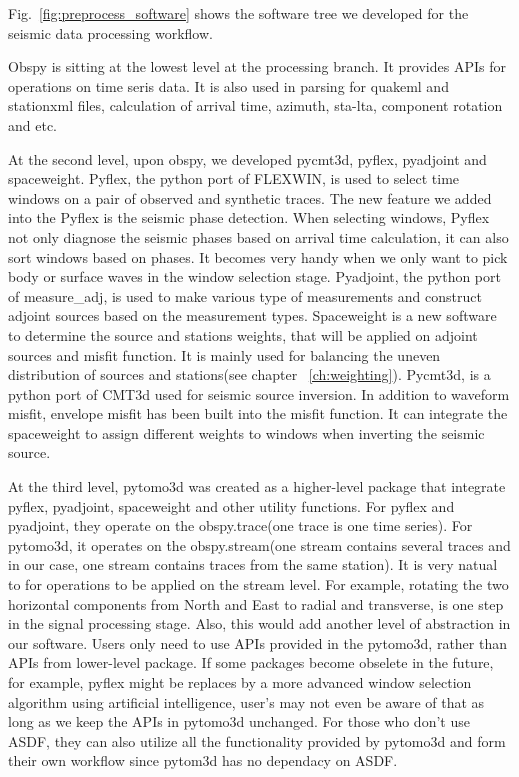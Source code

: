 Fig.~\ref{fig:preprocess_software} shows the software tree we developed
for the seismic data processing workflow.

Obspy is sitting at the lowest level at the processing branch. It provides
APIs for operations on time seris data. It is also used in
parsing for quakeml and stationxml files, calculation of arrival time, azimuth,
sta-lta, component rotation and etc.

At the second level, upon obspy, we developed pycmt3d, pyflex, pyadjoint and spaceweight.
Pyflex, the python port of FLEXWIN, is used to select time windows on a pair of observed
and synthetic traces. The new feature we added into the Pyflex is the seismic
phase detection. When selecting windows, Pyflex not only diagnose the seismic phases
based on arrival time calculation, it can also sort windows based on phases.
It becomes very handy when we only want to pick body or surface waves in the window
selection stage. Pyadjoint, the python port of measure\_adj, is used to make
various type of measurements and construct adjoint sources based on the measurement
types. Spaceweight is a new software to determine the source and stations weights,
that will be applied on adjoint sources and misfit function. It is mainly used for
balancing the uneven distribution of sources and stations(see chapter ~\ref{ch:weighting}).
Pycmt3d, is a python port of CMT3d used for seismic source inversion. In addition
to waveform misfit, envelope misfit has been built into the misfit function. It
can integrate the spaceweight to assign different weights to windows when inverting
the seismic source.

At the third level, pytomo3d was created as a higher-level package that integrate
pyflex, pyadjoint, spaceweight and other utility functions.
For pyflex and pyadjoint, they operate on the 
obspy.trace(one trace is one time series). For pytomo3d, it operates on the
obspy.stream(one stream contains several traces and in our case, one stream
contains traces from the same station). It is very natual to for operations to be
applied on the stream level. For example, rotating the two horizontal components 
from North and East to radial and transverse, is one step in the signal processing
stage. Also, this would add another level of abstraction in our software.
Users only need to use APIs provided in the pytomo3d,
rather than APIs from lower-level package.
If some packages become obselete in the future, for example, pyflex might be
replaces by a more advanced window selection algorithm using artificial intelligence,
user's may not even be aware of that as long as we keep the APIs in pytomo3d unchanged. 
For those who don't use ASDF, they can also utilize all the functionality provided by
pytomo3d and form their own workflow since pytom3d has no dependacy on ASDF.

